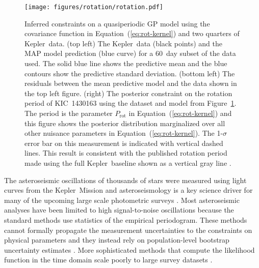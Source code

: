 \documentclass[manuscript, letterpaper]{aastex6}
\makeatletter
\let\origsubsection\subsection
\renewcommand\subsection{\@ifstar{\starsubsection}{\nostarsubsection}}
\newcommand\nostarsubsection[1]{\subsectionprelude\origsubsection{#1}}
\newcommand\starsubsection[1]{\subsectionprelude\origsubsection*{#1}}
\newcommand\subsectionprelude{\vspace{1em}}
\newcommand{\project}[1]{\textsf{#1}}
\newcommand{\kepler}{\project{Kepler}}
\newcommand{\figureref}[1]{\ref{fig:#1}}
\newcommand{\Figure}[1]{Figure~\figureref{#1}}
\newcommand{\figurelabel}[1]{\label{fig:#1}}
\renewcommand{\eqref}[1]{\ref{eq:#1}}
\newcommand{\Eq}[1]{Equation~(\eqref{#1})}
\newcommand{\eq}[1]{\Eq{#1}}
\newcommand{\sectlabel}[1]{\label{sect:#1}}
\newcommand{\responseb}[1]{{#1}}
\makeatother
\begin{document}


\begin{figure}[hptb]
    \begin{center}
        \texttt{[image: figures/rotation/rotation.pdf]}
        \caption{Inferred constraints on a quasiperiodic GP model using the covariance
            function in \eq{rot-kernel} and two quarters of \kepler\ data.
            (top left) The \kepler\ data (black points) and the MAP model
            prediction (blue curve) for a 60~day subset of the data used.
            The solid blue line shows the predictive mean and the blue contours show
            the predictive standard deviation.
            (bottom left) The residuals between the mean predictive model and the data
            shown in the top left figure.
            (right) The posterior constraint on the rotation period of KIC~1430163 using
            the dataset and model from \Figure{rotation}.
            The period is the parameter $P_\mathrm{rot}$ in \eq{rot-kernel} and this
            figure shows the posterior distribution marginalized over all other
            nuisance parameters in \eq{rot-kernel}.
            \responseb{The 1-$\sigma$ error bar on this measurement is indicated with
                vertical dashed lines.}
            This result is consistent with the
            published rotation period made using the full
            \kepler\ baseline shown as a vertical gray line \citep{Mathur:2014}.
            \figurelabel{rotation}}
    \end{center}
\end{figure}

\subsection{Example 4: Asteroseismic oscillations}\sectlabel{astero}

The asteroseismic oscillations of thousands of stars were measured using light
curves from the \kepler\ Mission \citep{Gilliland:2010, Huber:2011,
    Chaplin:2011, Chaplin:2013, Stello:2013} and asteroseismology is a key science
driver for many of the upcoming large scale photometric surveys
\citep{Campante:2016, Rauer:2014, Gould:2015}.
Most asteroseismic analyses have been limited to high signal-to-noise
oscillations because the standard methods use statistics of the empirical
periodogram.
These methods cannot formally propagate the measurement uncertainties to the
constraints on physical parameters and they instead rely on population-level
bootstrap uncertainty estimates \citep{Huber:2009}.
More sophisticated methods that compute the likelihood function in the time
domain scale poorly to large survey datasets \citep{Brewer:2009,
    Corsaro:2014}.
\end{document}
